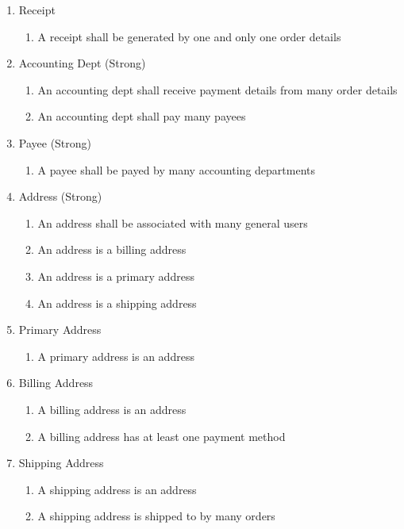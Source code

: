 \begin{enumerate}
\item Receipt
\begin{enumerate}
	\item A receipt shall be generated by one and only one order details
\end{enumerate}
	
\item Accounting Dept (Strong)
\begin{enumerate}
	\item An accounting dept shall receive payment details from many order details
	\item An accounting dept shall pay many payees
\end{enumerate}

\item Payee (Strong)
\begin{enumerate}
	\item A payee shall be payed by many accounting departments
\end{enumerate}
	
\item Address (Strong)
\begin{enumerate}
	\item An address shall be associated with many general users
	\item An address is a billing address
	\item An address is a primary address
	\item An address is a shipping address
\end{enumerate}
	
\item Primary Address
\begin{enumerate}
	\item A primary address is an address
\end{enumerate}
	
\item Billing Address
\begin{enumerate}
	\item A billing address is an address
	\item A billing address has at least one payment method
\end{enumerate}
	
\item Shipping Address
\begin{enumerate}
	\item A shipping address is an address
	\item A shipping address is shipped to by many orders
\end{enumerate}


\end{enumerate}

